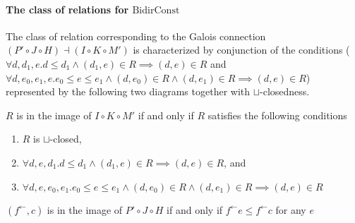 \documentclass{llncs}
\newcommand{\UnidirConst}{\mathrm{BidirConst}}
\newcommand{\fb}{{f^{\leftarrow}}}
\newcommand{\join}{\sqcup}
\newcommand{\comp}{\circ}
\newcommand{\rotleq}{\rotatebox[origin=c]{90}{$\leq$}}
\begin{document}
  \paragraph{The class of relations for $\UnidirConst$}
  The class of relation corresponding to the Galois connection $(P' \comp J \comp H)  \dashv (I \comp K \comp M')$
  is characterized by conjunction of the conditions
  ($\forall d, d_{1}, e. d \leq d_{1} \land (d_{1}, e) \in R \implies (d , e) \in R$ and $\forall d, e_{0}, e_{1}, e. e_{0} \leq e \leq e_{1} \land (d, e_{0}) \in R \land (d, e_{1}) \in R \implies (d , e) \in R$)
  represented by the following two diagrams together with $\join$-closedness.
  \begin{center}
  \end{center}
  \begin{proposition}\label{prop:predown-postsegment}
    $R$ is in the image of $I \comp K \comp M'$ if and only if $R$ satisfies the following conditions
    \begin{enumerate}[i]
      \item $R$ is $\join$-closed,
      \item $\forall d, e , d_{1}. d \leq d_{1} \land (d_{1} , e) \in R \implies (d , e) \in R$, and
      \item $\forall d, e , e_{0}, e_{1}. e_{0} \leq e \leq e_{1} \land (d , e_{0}) \in R \land (d , e_{1}) \in R \implies (d , e) \in R$
    \end{enumerate}
  \end{proposition}

  \begin{proposition}\label{prop:constant-max}
    $(\fb , c)$ is in the image of $P' \comp J \comp H$ if and only if $\fb e \leq \fb c$ for any $e$
  \end{proposition}
\end{document}
